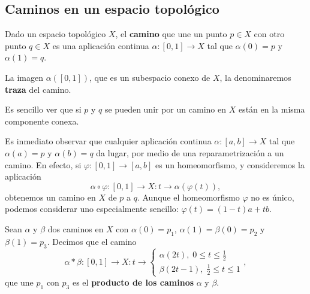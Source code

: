 \subsection{Caminos en un espacio topológico}
\begin{definition}[Camino]
	Dado un espacio topológico $\displaystyle X $, el \textbf{camino} que une un punto $\displaystyle p \in X $ con otro punto $\displaystyle q \in X $ es una aplicación continua $\displaystyle \alpha:\left[0,1\right] \to X $ tal que $\displaystyle \alpha\left(0\right)=p $ y $\displaystyle \alpha\left(1\right)=q $.
\end{definition}
\begin{notation}
	La imagen $\displaystyle \alpha\left(\left[0,1\right] \right) $, que es un subespacio conexo de $\displaystyle X $, la denominaremos \textbf{traza} del camino. 
\end{notation}
\begin{observation}
Es sencillo ver que si $\displaystyle p $ y $\displaystyle q $ se pueden unir por un camino en $\displaystyle X $ están en la misma componente conexa.
\end{observation}
\begin{observation}
	Es inmediato observar que cualquier aplicación continua $\displaystyle \alpha : \left[a,b\right] \to X $ tal que $\displaystyle \alpha\left(a\right)=p $ y $\displaystyle \alpha\left(b\right)=q $ da lugar, por medio de una reparametrización a un camino. En efecto, si $\displaystyle \varphi : \left[0,1\right] \to \left[a,b\right]  $ es un homeomorfismo, y consideremos la aplicación
	\[\alpha \circ \varphi : \left[0,1\right] \to X : t \to \alpha\left(\varphi\left(t\right)\right) ,\]
obtenemos un camino en $\displaystyle X $ de $\displaystyle p $ a $\displaystyle q $. Aunque el homeomorfismo $\displaystyle \varphi $ no es único, podemos considerar uno especialmente sencillo: $\displaystyle \varphi\left(t\right)=\left(1-t\right)a + tb $. 	
\end{observation}
\begin{definition}
Sean $\displaystyle \alpha  $ y $\displaystyle \beta  $ dos caminos en $\displaystyle X $ con $\displaystyle \alpha\left(0\right)=p_{1} $, $\displaystyle \alpha\left(1\right)=\beta\left(0\right)=p_{2} $ y $\displaystyle \beta\left(1\right)=p_{3} $. Decimos que el camino
\[\alpha * \beta : \left[0,1\right] \to X : t \to 
\begin{cases}
\alpha\left(2t\right), \; 0 \leq t \leq \frac{1}{2} \\
\beta\left(2t-1\right), \; \frac{1}{2}\leq t\leq 1
\end{cases}
,\]
que une $\displaystyle p_{1} $ con $\displaystyle p_{3} $ es el \textbf{producto de los caminos} $\displaystyle \alpha  $ y $\displaystyle \beta  $. 
\end{definition}
